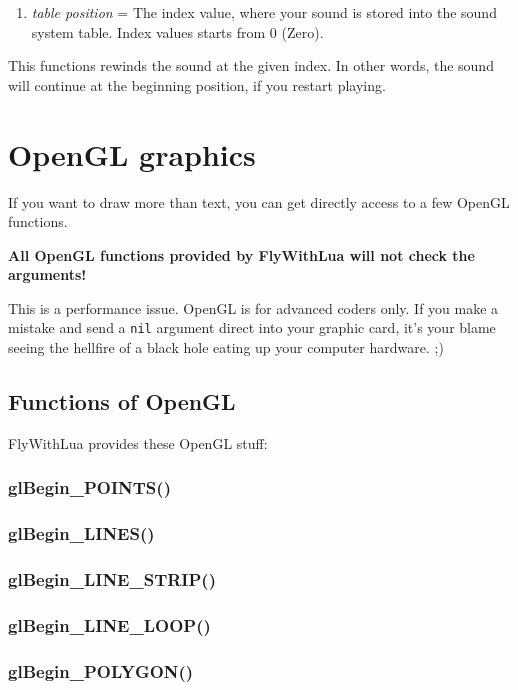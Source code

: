 \documentclass[11pt,parskip=half,a4paper]{scrartcl}
\begin{document}
\begin{enumerate}
	\item \emph{table position} = The index value, where your sound is stored into the sound system table. Index values starts from 0 (Zero).
\end{enumerate}

This functions rewinds the sound at the given index. In other words, the sound will continue at the beginning position, if you restart playing.


\newpage
\section{OpenGL graphics}

If you want to draw more than text, you can get directly access to a few OpenGL functions.

\textbf{All OpenGL functions provided by FlyWithLua will not check the arguments!}

This is a performance issue. OpenGL is for advanced coders only. If you make a mistake and send a \verb|nil| argument direct into your graphic card, it's your blame seeing the hellfire of a black hole eating up your computer hardware. ;)

\subsection{Functions of OpenGL}

FlyWithLua provides these OpenGL stuff:

\subsubsection{glBegin\_POINTS()}

\subsubsection{glBegin\_LINES()}

\subsubsection{glBegin\_LINE\_STRIP()}

\subsubsection{glBegin\_LINE\_LOOP()}

\subsubsection{glBegin\_POLYGON()}
\end{document}

